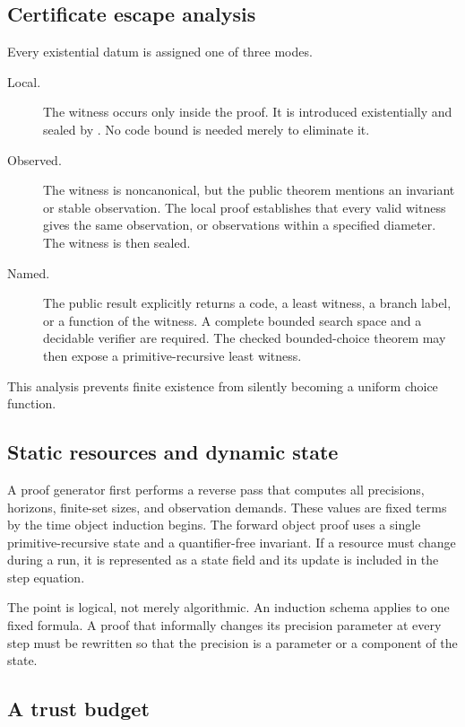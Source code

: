 \subsection{Certificate escape analysis}

Every existential datum is assigned one of three modes.

\begin{description}
\item[Local.] The witness occurs only inside the proof.  It is introduced existentially and sealed
by .  No code bound is needed merely to eliminate it.

\item[Observed.] The witness is noncanonical, but the public theorem mentions an invariant or stable
observation.  The local proof establishes that every valid witness gives the same observation, or
observations within a specified diameter.  The witness is then sealed.

\item[Named.] The public result explicitly returns a code, a least witness, a branch label, or a
function of the witness.  A complete bounded search space and a decidable verifier are required.
The checked bounded-choice theorem may then expose a primitive-recursive least witness.
\end{description}

This analysis prevents finite existence from silently becoming a uniform choice function.

\subsection{Static resources and dynamic state}

A proof generator first performs a reverse pass that computes all precisions, horizons, finite-set
sizes, and observation demands.  These values are fixed terms by the time object induction begins.
The forward object proof uses a single primitive-recursive state and a quantifier-free invariant.
If a resource must change during a run, it is represented as a state field and its update is included
in the step equation.

The point is logical, not merely algorithmic.  An induction schema applies to one fixed formula.  A
proof that informally changes its precision parameter at every step must be rewritten so that the
precision is a parameter or a component of the state.

\subsection{A trust budget}

